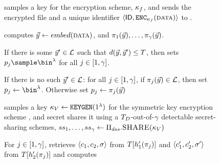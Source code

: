 \begin{figure}
{\begin{minipage}[t]{\textwidth}
\enumListStartResume
\item \client samples a key for the encryption scheme, $\kappa_{f}$, and sends the encrypted file and a unique identifier $\langle \genericFileID, \encrypt[\fileKey](\clientData) \rangle$ to \server.

\item \client computes $\clientVec \gets \embed(\clientData)$, and $\projFn[1](\clientVec), \dots, \projFn[\numProjections](\clientVec)$.

\enumListStart
\item  If there is some $\clientVec' \in \prevHashList$ such that $\hammingDist{\clientVec}{\clientVec'} \le \threshold$, then \client sets $\clientVecProj[\projIdx] \sample \bin^{\secParam}$ for all $j \in [1, \gamma]$.   
\item If there is no such $\clientVec' \in \prevHashList$: for all $j \in [1, \gamma]$, if $\projFn[\projIdx](\clientVec) \in \prevHashList$, then set $\clientVecProj[\projIdx] \assign \bin^{\secParam}$. Otherwise set $\clientVecProj[\projIdx] \assign \projFn[\projIdx](\clientVec)$
\enumListEnd



%

\item \client samples a key $\voucherKey \assign \encryptKeyGen(1^\secParam)$ for the symmetric key encryption scheme \encryptionSchemeDefn, and secret shares it using a 
$T_{D}$-out-of-$\gamma$ detectable secret-sharing schemes, 
$ss_{1}, \dots, ss_{\gamma} \gets \Pi_{dss}.\textsc{SHARE}(\kappa_{V})$

\item\label{fuzzy:pre:match_cht} For $j \in [1, \gamma]$, \client retrieves $\langle \ciphertext[1], \ciphertext[2], \genericSig \rangle$ from $\cuckooTable[\cuckooHashFn{1}(\projFn[\projIdx])]$ and 
$\langle \ciphertext[1]', \ciphertext[2]', \genericSig' \rangle$ from $\cuckooTable[\cuckooHashFn{2}(\projFn[\projIdx])]$ and computes


\end{minipage}}
\end{figure}

